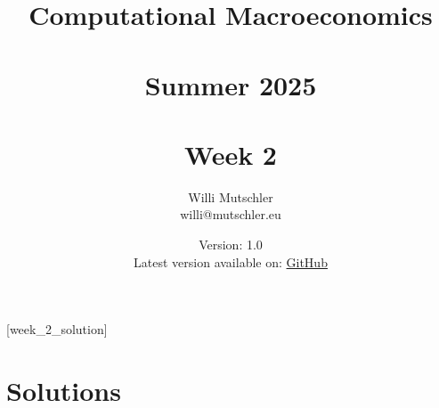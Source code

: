 
\newif\ifDisplaySolutions\DisplaySolutionstrue%


\title{Computational Macroeconomics\\~\\Summer 2025\\~\\Week 2}
\author{Willi Mutschler\\willi@mutschler.eu}
\date{Version: 1.0\\Latest version available on: \href{https://github.com/wmutschl/Computational-Macroeconomics/releases/latest/download/week_2.pdf}{GitHub}}
\maketitle\thispagestyle{empty}

\newpage
{}[week_2_solution]
\tableofcontents\thispagestyle{empty}\newpage

\setcounter{page}{1}
\newpage
\newpage
\newpage
\printbibliography%
\newpage

\ifDisplaySolutions%
\newpage
\appendix
\section{Solutions}

\fi
